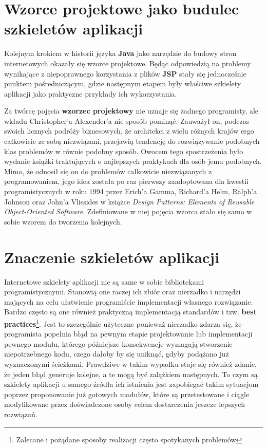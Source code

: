 \section{Wzorce projektowe jako budulec szkieletów aplikacji}
	Kolejnym krokiem w historii języka \textbf{Java} jako narzędzie do budowy stron internetowych okazały się wzorce projektowe.
	Będąc odpowiedzią na problemy wynikające z niepoprawnego korzystania z plików \textbf{JSP} stały się jednocześnie punktem
	pośredniczącym, gdzie następnym etapem były właściwe szkielety aplikacji jako praktyczne przykłady ich wykorzystania.
	
	Za twórcę pojęcia \textbf{wzorzec projektowy} nie uznaje się żadnego programisty, ale wkładu Christopher'a Alexender'a nie sposób pominąć.
	Zauważył on, podczas swoich licznych podróży biznesowych, że architekci z wielu różnych krajów ergo całkowicie ze sobą niezwiązani, 
	przejawią tendencję do rozwiązywanie podobnych klas problemów w równie podobny sposób. Owocem tego spostrzeżenia było wydanie 
	książki traktujących o najlepszych praktykach dla osób jemu podobnych\cite{christoper_alexander_influence}. Mimo, że odnosił się on 
	do problemów całkowicie niezwiązanych z programowaniem, jego idea została po raz pierwszy zaadoptowana dla kwestii programistycznych 
	w roku 1994 przez Erich'a Gamma, Richard'a Helm, Ralph'a Johnson oraz John'a Vlissides w książce \textit{Design Patterns: Elements of Reusable Object-Oriented Software}. 
	Zdefiniowane w niej pojęcia wzorca stało się samo w sobie wzorem do tworzenia kolejnych. 

\section{Znaczenie szkieletów aplikacji}
	Internetowe szkielety aplikacji nie są same w sobie bibliotekami programistycznymi. Stanowią one raczej ich zbiór oraz nierzadko i 
	narzędzi mających na celu ułatwienie programiście implementacji własnego rozwiązanie. Bardzo często są one również praktyczną 
	implementacją standardów i tzw. \textbf{best practices}\footnote{Zalecane i pożądane sposoby realizacji często spotykanych problemów}. 
	Jest to szczególnie użyteczne ponieważ nierzadko zdarza się, że programista popełnia błąd na pewnym etapie projektowanie lub implementacji 
	pewnego modułu, którego późniejsze konsekwencje wymagają stworzenie niepotrzebnego kodu, czego dałoby by się uniknąć, gdyby podążano
	już wyznaczonymi ścieżkami. Prawdziwe w takim wypadku staje się również zdanie, że jeden błąd generuje kolejne, a te mogą być zalążkiem następnych.
	To czym są szkielety aplikacji u samego źródła ich istnienia jest zapobiegać takim sytuacjom poprzez proponowanie już gotowych modułów,
	które są przetestowane i ciągle modyfikowane przez doświadczone osoby celem dostarczenia jeszcze lepszych rozwiązań\cite{art_of_java_web_dev}.
	
